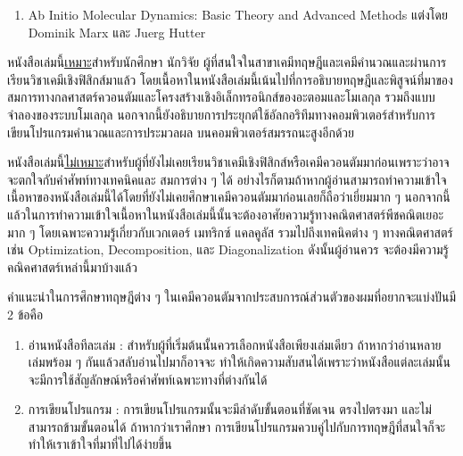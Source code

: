 {\begin{enumerate}
    \item Ab Initio Molecular Dynamics: Basic Theory and Advanced Methods
    แต่งโดย Dominik Marx และ Juerg Hutter\autocite{marx2009}
    
\end{enumerate}

หนังสือเล่มนี้\underline{เหมาะ}สำหรับนักศึกษา นักวิจัย ผู้ที่สนใจในสาขาเคมีทฤษฎีและเคมีคำนวณและผ่านการเรียนวิชาเคมีเชิงฟิสิกส์มาแล้ว 
โดยเนื้อหาในหนังสือเล่มนี้เน้นไปที่การอธิบายทฤษฎีและพิสูจน์ที่มาของสมการทางกลศาสตร์ควอนตัมและโครงสร้างเชิงอิเล็กทรอนิกส์ของอะตอมและโมเลกุล%
รวมถึงแบบจำลองของระบบโมเลกุล นอกจากนี้ยังอธิบายการประยุกต์ใช้อัลกอริทึมทางคอมพิวเตอร์สำหรับการเขียนโปรแกรมคำนวณและการประมวลผล%
บนคอมพิวเตอร์สมรรถนะสูงอีกด้วย

หนังสือเล่มนี้\underline{ไม่เหมาะ}สำหรับผู้ที่ยังไม่เคยเรียนวิชาเคมีเชิงฟิสิกส์หรือเคมีควอนตัมมาก่อนเพราะว่าอาจจะตกใจกับคำศัพท์ทางเทคนิคและ%
สมการต่าง ๆ ได้ อย่างไรก็ตามถ้าหากผู้อ่านสามารถทำความเข้าใจเนื้อหาของหนังสือเล่มนี้ได้โดยที่ยังไม่เคยศึกษาเคมีควอนตัมมาก่อนเลยก็ถือว่าเยี่ยมมาก ๆ 
นอกจากนี้แล้วในการทำความเข้าใจเนื้อหาในหนังสือเล่มนี้นั้นจะต้องอาศัยความรู้ทางคณิตศาสตร์พีชคณิตเยอะมาก ๆ โดยเฉพาะความรู้เกี่ยวกับเวกเตอร์ 
เมทริกซ์ แคลคูลัส รวมไปถึงเทคนิคต่าง ๆ ทางคณิตศาสตร์ เช่น Optimization, Decomposition, และ Diagonalization ดังนั้นผู้อ่านควร%
จะต้องมีความรู้คณิคศาสตร์เหล่านี้มาบ้างแล้ว

คำแนะนำในการศึกษาทฤษฎีต่าง ๆ ในเคมีควอนตัมจากประสบการณ์ส่วนตัวของผมที่อยากจะแบ่งปันมี 2 ข้อคือ 
\begin{enumerate}
    \item อ่านหนังสือทีละเล่ม : สำหรับผู้ที่เริ่มต้นนั้นควรเลือกหนังสือเพียงเล่มเดียว ถ้าหากว่าอ่านหลายเล่มพร้อม ๆ กันแล้วสลับอ่านไปมาก็อาจจะ%
    ทำให้เกิดความสับสนได้เพราะว่าหนังสือแต่ละเล่มนั้นจะมีการใช้สัญลักษณ์หรือคำศัพท์เฉพาะทางที่ต่างกันได้
    \item การเขียนโปรแกรม : การเขียนโปรแกรมนั้นจะมีลำดับขั้นตอนที่ชัดเจน ตรงไปตรงมา และไม่สามารถข้ามขั้นตอนได้ ถ้าหากว่าเราศึกษา%
    การเขียนโปรแกรมควบคู่ไปกับการทฤษฎีที่สนใจก็จะทำให้เราเข้าใจที่มาที่ไปได้ง่ายขึ้น
\end{enumerate}

}
